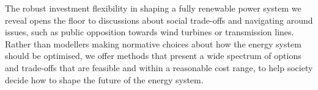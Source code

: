 The robust investment flexibility in shaping a fully renewable power system we
reveal opens the floor to discussions about social trade-offs and navigating
around issues, such as public opposition towards wind turbines or transmission
lines. Rather than modellers making normative choices about how the energy
system should be optimised, we offer methods that present a wide spectrum of
options and trade-offs that are feasible and within a reasonable cost range, to
help society decide how to shape the future of the energy system.


